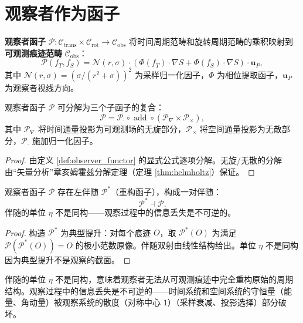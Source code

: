 \section{观察者作为函子}\label{sec:observer_functor}

\begin{definition}[观察者函子]\label{def:observer_functor}
\textbf{观察者函子} $\mathcal{P}: \mathcal{C}_{\text{trans}} \times \mathcal{C}_{\text{rot}} \to \mathcal{C}_{\text{obs}}$ 将时间周期范畴和旋转周期范畴的乘积映射到\textbf{可观测痕迹范畴} $\mathcal{C}_{\text{obs}}$：
\[
\mathcal{P}(f_T, f_S) = \mathcal{N}(r, \sigma) \cdot \left( \Phi(f_T) \cdot \nabla S + \Phi(f_S) \cdot \nabla S \right) \cdot \mathbf{u}_P,
\]
其中 $\mathcal{N}(r, \sigma) = (\sigma/(r^2+\sigma))^2$ 为采样归一化因子，$\Phi$ 为相位提取函子，$\mathbf{u}_P$ 为观察者视线方向。
\end{definition}

\begin{theorem}[观察者函子的分解]\label{thm:observer_functor_decomposition}
观察者函子 $\mathcal{P}$ 可分解为三个子函子的复合：
\[
\mathcal{P} = \mathcal{P}_{\cdot} \circ \operatorname{add} \circ (\mathcal{P}_{\nabla} \times \mathcal{P}_{\times}),
\]
其中 $\mathcal{P}_{\nabla}$ 将时间通量投影为可观测场的无旋部分，$\mathcal{P}_{\times}$ 将空间通量投影为无散部分，$\mathcal{P}_{\cdot}$ 施加归一化因子。
\end{theorem}

\begin{proof}
由定义 \ref{def:observer_functor} 的显式公式逐项分解。无旋/无散的分解由“矢量分析”章亥姆霍兹分解定理（定理 \ref{thm:helmholtz}）保证。
\end{proof}

\begin{corollary}[观察者函子与伴随性]\label{cor:observer_adjunction}
观察者函子 $\mathcal{P}$ 存在左伴随 $\mathcal{P}^*$（重构函子），构成一对伴随：
\[
\mathcal{P}^* \dashv \mathcal{P}.
\]
伴随的单位 $\eta$ 不是同构——观察过程中的信息丢失是不可逆的。
\end{corollary}

\begin{proof}
构造 $\mathcal{P}^*$ 为典型提升：对每个痕迹 $O$，取 $\mathcal{P}^*(O)$ 为满足 $\mathcal{P}(\mathcal{P}^*(O)) = O$ 的极小范数原像。伴随双射由线性结构给出。单位 $\eta$ 不是同构因为典型提升不是观察的截面。
\end{proof}

\begin{remark}[观察者函子与守恒律破缺]\label{rem:observer_conservation_breaking}
伴随的单位 $\eta$ 不是同构，意味着观察者无法从可观测痕迹中完全重构原始的周期结构。观察过程中的信息丢失是不可逆的——时间系统和空间系统的守恒量（能量、角动量）被观察系统的散度（对称中心 $1$）（采样衰减、投影选择）部分破坏。
\end{remark}

